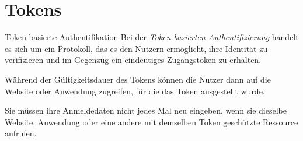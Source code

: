 \section{Tokens}

\begin{defi}{Token-basierte Authentifikation}
    Bei der \emph{Token-basierten Authentifizierung} handelt es sich um ein Protokoll, das es den Nutzern ermöglicht, ihre Identität zu verifizieren und im Gegenzug ein eindeutiges Zugangstoken zu erhalten.

    Während der Gültigkeitsdauer des Tokens können die Nutzer dann auf die Website oder Anwendung zugreifen, für die das Token ausgestellt wurde.

    Sie müssen ihre Anmeldedaten nicht jedes Mal neu eingeben, wenn sie dieselbe Website, Anwendung oder eine andere mit demselben Token geschützte Ressource aufrufen.
\end{defi}

